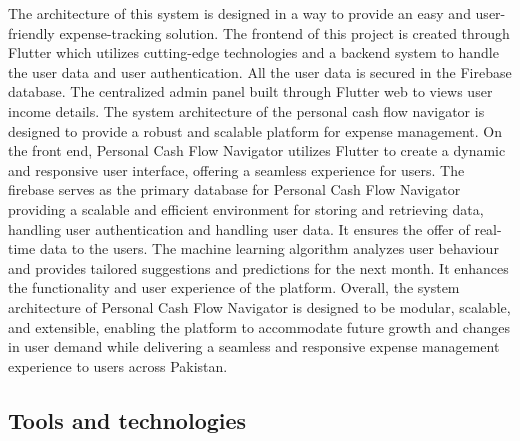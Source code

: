 \documentclass[12pt]{article}
\begin{document}
\noindent
\normalsize The architecture of this system is designed in a way to provide an easy and user-friendly expense-tracking solution. The frontend of this project is created through Flutter which utilizes cutting-edge technologies and a backend system to handle the user data and user authentication. All the user data is secured in the Firebase database. The centralized admin panel built through Flutter web to  views user income details. The system architecture of the personal cash flow navigator is designed to provide a robust and scalable platform for expense management.\cite{bozkus2009analytical}
On the front end, Personal Cash Flow Navigator utilizes Flutter to create a dynamic and responsive user interface, offering a seamless experience for users. 
The firebase serves as the primary database for Personal Cash Flow Navigator providing a scalable and efficient environment for storing and retrieving data, handling user authentication and handling user data. It ensures the offer of real-time data to the users.
The machine learning algorithm analyzes user behaviour and provides tailored suggestions and predictions for the next month. It enhances the functionality and user experience of the platform.
Overall, the system architecture of Personal Cash Flow Navigator is designed to be modular, scalable, and extensible, enabling the platform to accommodate future growth and changes in user demand while delivering a seamless and responsive expense management experience to users across Pakistan.\cite{khandelwal2022developing}




\vspace{0.5cm} %

\noindent
\subsection{Tools and technologies}
\vspace{0.5cm} %
\end{document}
